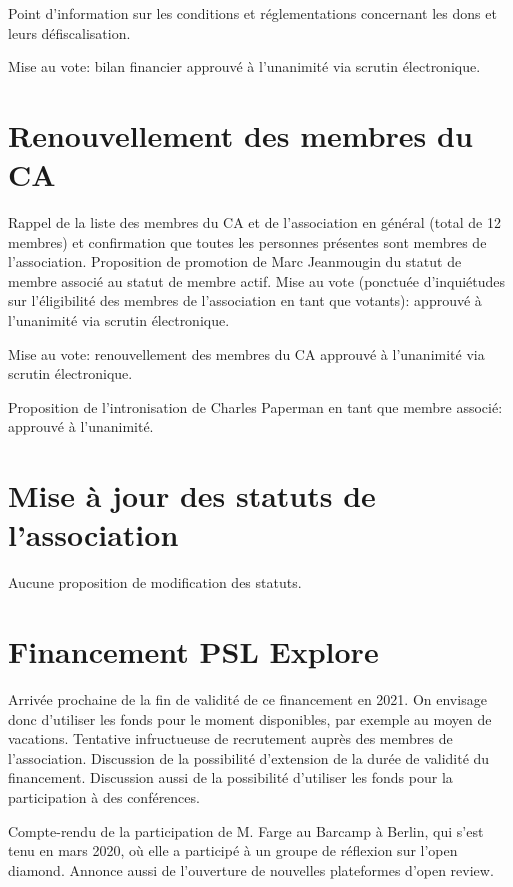\documentclass[a4paper]{article}
\begin{document}
Point d'information sur les conditions et réglementations concernant les dons et leurs défiscalisation. 

Mise au vote: bilan financier approuvé à l'unanimité via scrutin électronique.

\section{Renouvellement des membres du CA}
    Rappel de la liste des membres du CA et de l'association en général (total de 12 membres) et confirmation que toutes les personnes présentes sont membres de l'association.
    Proposition de promotion de Marc Jeanmougin du statut de membre associé au statut de membre actif.
    Mise au vote (ponctuée d'inquiétudes sur l'éligibilité des membres de l'association en tant que votants): approuvé à l'unanimité via scrutin électronique.

    Mise au vote: renouvellement des membres du CA approuvé à l'unanimité via scrutin électronique.

Proposition de l'intronisation de Charles Paperman en tant que membre associé: approuvé à l'unanimité. 


\section{Mise à jour des statuts de l'association}
Aucune proposition de modification des statuts. 

\section{Financement PSL Explore}
Arrivée prochaine de la fin de validité de ce financement en 2021. On envisage
donc d'utiliser les fonds pour le moment disponibles, par exemple au moyen de vacations. 
Tentative infructueuse de recrutement auprès des membres de l'association.
Discussion de la possibilité d'extension de la durée de validité du financement. Discussion aussi de la possibilité d'utiliser les fonds pour la participation à des conférences.

Compte-rendu de la participation de M. Farge au Barcamp à Berlin, qui s'est tenu en mars 2020, où elle a participé à un groupe de réflexion sur l'open diamond. Annonce aussi de l'ouverture de nouvelles plateformes d'open review. 
\end{document}
